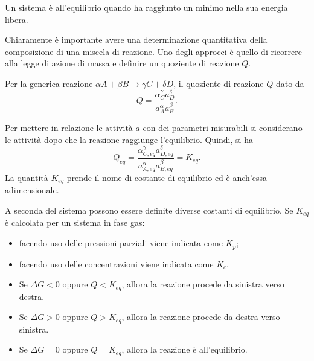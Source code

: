 \begin{defn}
    Un sistema è all'equilibrio quando ha raggiunto un minimo nella sua energia libera.
\end{defn}
Chiaramente è importante avere una determinazione quantitativa della composizione di una miscela di reazione. Uno degli approcci è quello di ricorrere alla legge di azione di massa e definire un quoziente di reazione $Q$.
\begin{defn}
    Per la generica reazione $\alpha A+\beta B\to\gamma C+\delta D$, il quoziente di reazione $Q$ dato da
    \begin{equation}
        Q=\frac{\alpha_C^\gamma a_D^\delta}{a_A^\alpha a_B^\beta}.
    \end{equation}
\end{defn}
Per mettere in relazione le attività $a$ con dei parametri misurabili si considerano le attività dopo che la reazione raggiunge l'equilibrio. Quindi, si ha
\begin{equation}
    Q_{eq}=\frac{\alpha_{C,eq}^\gamma a_{D,eq}^\delta}{a_{A,eq}^\alpha a_{B,eq}^\beta}=K_{eq}.
\end{equation}
La quantità $K_{eq}$ prende il nome di costante di equilibrio ed è anch'essa adimensionale.
\begin{obs}
     A seconda del sistema possono essere definite diverse costanti di equilibrio. Se $K_{eq}$ è calcolata per un sistema in fase gas:
     \begin{itemize}
         \item facendo uso delle pressioni parziali viene indicata come $K_p$;
         \item facendo uso delle concentrazioni viene indicata come $K_c$.
     \end{itemize}
\end{obs}
\begin{axiom}\hfill
    \begin{itemize}
        \item Se $\Delta G<0$ oppure $Q<K_{eq}$, allora la reazione procede da sinistra verso destra.
        \item Se $\Delta G>0$ oppure $Q>K_{eq}$, allora la reazione procede da destra verso sinistra.
        \item Se $\Delta G=0$ oppure $Q=K_{eq}$, allora la reazione è all'equilibrio.
    \end{itemize}
\end{axiom}

